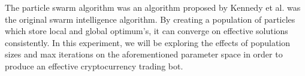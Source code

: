 The particle swarm algorithm was an algorithm proposed by Kennedy et al. \cite{pso} was the original swarm intelligence algorithm. By creating a
population of particles which store local and global optimum's, it can converge on effective solutions consistently. In this experiment, we will be 
exploring the effects of population sizes and max iterations on the aforementioned parameter space in order to produce an effective cryptocurrency trading bot.
